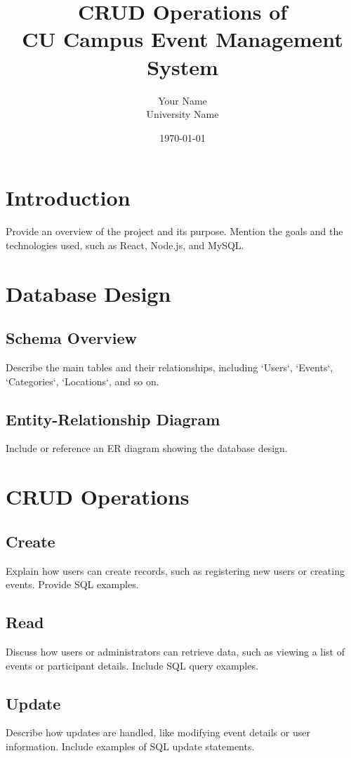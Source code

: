 \documentclass[a4paper]{article}
\title{CRUD Operations of \\ CU Campus Event Management System}
\author{Your Name \\ University Name}
\date{\today}
\begin{document}
\maketitle

\tableofcontents
\newpage

\section{Introduction}
Provide an overview of the project and its purpose. Mention the goals and the technologies used, such as React, Node.js, and MySQL.

\section{Database Design}
\subsection{Schema Overview}
Describe the main tables and their relationships, including `Users`, `Events`, `Categories`, `Locations`, and so on.

\subsection{Entity-Relationship Diagram}
Include or reference an ER diagram showing the database design.

\section{CRUD Operations}
\subsection{Create}
Explain how users can create records, such as registering new users or creating events. Provide SQL examples.

\subsection{Read}
Discuss how users or administrators can retrieve data, such as viewing a list of events or participant details. Include SQL query examples.

\subsection{Update}
Describe how updates are handled, like modifying event details or user information. Include examples of SQL update statements.
\end{document}
